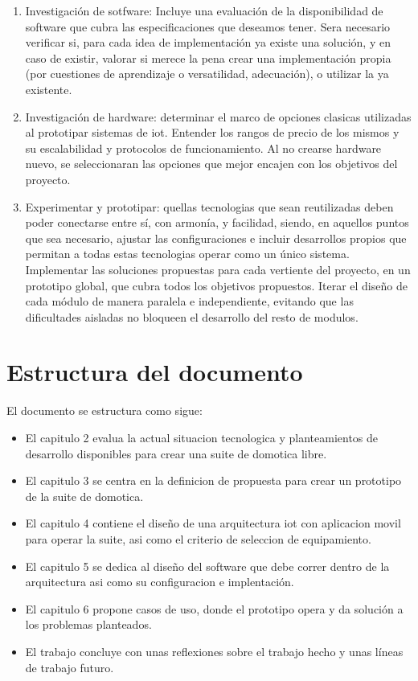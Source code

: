 \begin{enumerate}
  \item Investigación de sotfware: Incluye una evaluación de la disponibilidad de software que cubra las especificaciones que deseamos tener. Sera necesario verificar si, para cada idea de implementación ya existe una solución, y en caso de existir, valorar si merece la pena crear una implementación propia (por cuestiones de aprendizaje o versatilidad, adecuación), o utilizar la ya existente.

  \item Investigación de hardware: determinar el marco de opciones clasicas utilizadas al prototipar sistemas de \gls{iot}. Entender los rangos de precio de los mismos y su escalabilidad y protocolos de funcionamiento. Al no crearse hardware nuevo, se seleccionaran las opciones que mejor encajen con los objetivos del proyecto.

  \item Experimentar y prototipar: quellas tecnologias que sean reutilizadas deben poder conectarse entre sí, con armonía, y facilidad, siendo, en aquellos puntos que sea necesario, ajustar las configuraciones e incluir desarrollos propios que permitan a todas estas tecnologias operar como un único sistema. Implementar las soluciones propuestas para cada vertiente del proyecto, en un prototipo global, que cubra todos los objetivos propuestos. Iterar el diseño de cada módulo de manera paralela e independiente, evitando que las dificultades aisladas no bloqueen el desarrollo del resto de modulos.

\end{enumerate}

\section{Estructura del documento}
\label{ch:Capitulo1.4}

El documento se estructura como sigue:

\begin{itemize}
  \item El capitulo 2 evalua la actual situacion tecnologica y planteamientos de desarrollo disponibles para crear una suite de domotica libre.

  \item El capitulo 3 se centra en la definicion de propuesta para crear un prototipo de la suite de domotica.

  \item El capitulo 4 contiene el diseño de una arquitectura \gls{iot} con aplicacion movil para operar la suite, asi como el criterio de seleccion de equipamiento.

  \item El capitulo 5 se dedica al diseño del software que debe correr dentro de la arquitectura asi como su configuracion e implentación.

  \item El capitulo 6 propone casos de uso, donde el prototipo opera y da solución a los problemas planteados.

  \item El trabajo concluye con unas reflexiones sobre el trabajo hecho y unas líneas de trabajo futuro.
\end{itemize}
